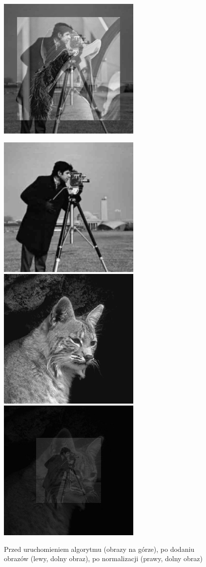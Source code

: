 \documentclass[a4paper,12pt]{book}
\begin{document}
\begin{figure}[H]
	\includegraphics[width=7cm, height=7cm]{2/sum-gray-images-norm.png}
\end{figure}
\begin{figure}[H]
	\caption{Przed uruchomieniem algorytmu (obrazy na górze), po dodaniu obrazów (lewy, dolny obraz), po normalizacji (prawy, dolny obraz)}
	\includegraphics[width=7cm, height=7cm]{man-unmodified.jpg}
	\includegraphics[width=7cm, height=7cm]{cat-unmodified.jpg}
	\includegraphics[width=7cm, height=7cm]{2/sum-gray-images-2.png}

\end{figure}
\end{document}
